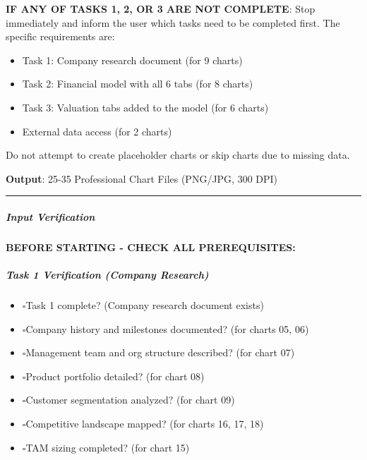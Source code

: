 \documentclass[11pt]{article}
\newcommand{\UncheckedBox}{$\square$}
\begin{document}
\textbf{IF ANY OF TASKS 1, 2, OR 3 ARE NOT COMPLETE}: Stop immediately and inform the user which tasks need to be completed first. The specific requirements are:

\begin{itemize}[leftmargin=*,itemsep=2pt,topsep=2pt]
\item {} Task 1: Company research document (for 9 charts)
\item {} Task 2: Financial model with all 6 tabs (for 8 charts)
\item {} Task 3: Valuation tabs added to the model (for 6 charts)
\item {} External data access (for 2 charts)
\end{itemize}

Do not attempt to create placeholder charts or skip charts due to missing data.


\textbf{Output}: 25-35 Professional Chart Files (PNG/JPG, 300 DPI)


\vspace{0.5em}\hrule\vspace{0.5em}

\subparagraph{Input Verification}\mbox{}\par

\textbf{BEFORE STARTING - CHECK ALL PREREQUISITES:}


\subparagraph{Task 1 Verification (Company Research)}\mbox{}\par
\begin{itemize}[leftmargin=*,itemsep=2pt,topsep=2pt]
\item {} \UncheckedBox Task 1 complete? (Company research document exists)
\item {} \UncheckedBox Company history and milestones documented? (for charts 05, 06)
\item {} \UncheckedBox Management team and org structure described? (for chart 07)
\item {} \UncheckedBox Product portfolio detailed? (for chart 08)
\item {} \UncheckedBox Customer segmentation analyzed? (for chart 09)
\item {} \UncheckedBox Competitive landscape mapped? (for charts 16, 17, 18)
\item {} \UncheckedBox TAM sizing completed? (for chart 15)
\end{itemize}
\end{document}

